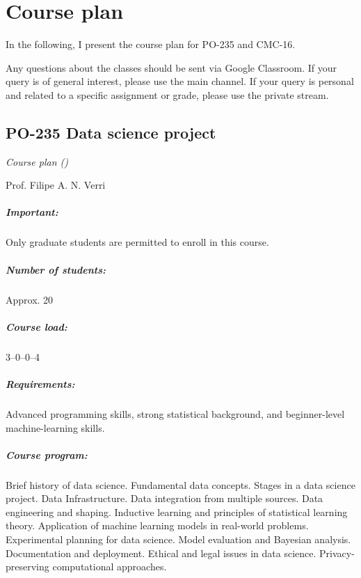 \chapter{Course plan}

In the following, I present the course plan for PO-235 and CMC-16.

Any questions about the classes should be sent via Google Classroom.  If your query is of
general interest, please use the main channel.  If your query is personal and related to
a specific assignment or grade, please use the private stream.

\newpage
\thispagestyle{empty}
\section*{PO-235 Data science project}

\emph{Course plan (\the\year{})}

Prof. Filipe A. N. Verri

\paragraph{Important:} Only graduate students are permitted to enroll in this course.

\paragraph{Number of students:} Approx. 20

\paragraph{Course load:} 3--0--0--4

\paragraph{Requirements:} Advanced programming skills, strong statistical background, and
beginner-level machine-learning skills.

\paragraph{Course program:}
Brief history of data science.  Fundamental data concepts. Stages in a data science
project.  Data Infrastructure. Data integration from multiple sources. Data engineering
and shaping.  Inductive learning and principles of statistical learning theory.
Application of machine learning models in real-world problems.  Experimental planning for
data science. Model evaluation and Bayesian analysis.  Documentation and deployment.
Ethical and legal issues in data science.  Privacy-preserving computational approaches.

